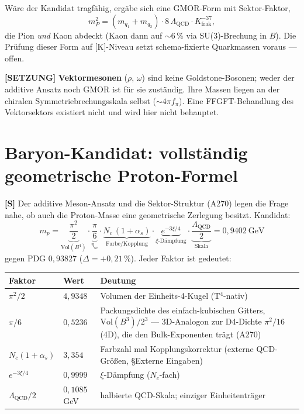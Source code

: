 Wäre der Kandidat tragfähig, ergäbe sich eine GMOR-Form mit
Sektor-Faktor,
\[
  m_P^2 = (m_{q_1}+m_{q_2})\cdot 8\,\Lambda_\text{QCD}
  \cdot K_\text{frak}^{-37},
\]
die Pion \emph{und} Kaon abdeckt (Kaon dann auf $\sim$6\,\% via
SU(3)-Brechung in $B$). Die Prüfung dieser Form auf [K]-Niveau setzt
schema-fixierte Quarkmassen voraus --- offen.

\medskip
\textbf{[SETZUNG]} \textbf{Vektormesonen} ($\rho$, $\omega$) sind keine
Goldstone-Bosonen; weder der additive Ansatz noch GMOR ist für sie
zuständig. Ihre Massen liegen an der chiralen Symmetriebrechungsskala
selbst ($\sim 4\pi f_\pi$). Eine FFGFT-Behandlung des Vektorsektors
existiert nicht und wird hier nicht behauptet.

\section{Baryon-Kandidat: vollständig geometrische Proton-Formel}

\textbf{[S]} Der additive Meson-Ansatz und die Sektor-Struktur (A270)
legen die Frage nahe, ob auch die Proton-Masse eine geometrische
Zerlegung besitzt. Kandidat:
\[
  m_p = \underbrace{\frac{\pi^2}{2}}_{\text{Vol}(B^4)}
  \cdot \underbrace{\frac{\pi}{6}}_{\eta_\text{sc}}
  \cdot \underbrace{N_c\,(1+\alpha_s)}_{\text{Farbe/Kopplung}}
  \cdot \underbrace{e^{-3\xi/4}}_{\xi\text{-Dämpfung}}
  \cdot \underbrace{\frac{\Lambda_\text{QCD}}{2}}_{\text{Skala}}
  = 0{,}9402\ \text{GeV}
\]
gegen PDG $0{,}93827$ ($\Delta = +0{,}21\,\%$). Jeder Faktor ist
gedeutet:

\begin{center}
\renewcommand{\arraystretch}{1.3}
{\small\begin{tabular}{llp{6.2cm}}
\toprule
Faktor & Wert & Deutung \\
\midrule
$\pi^2/2$ & $4{,}9348$ & Volumen der Einheits-4-Kugel (T$^4$-nativ) \\
$\pi/6$ & $0{,}5236$ & Packungsdichte des einfach-kubischen Gitters,
$\text{Vol}(B^3)/2^3$ --- 3D-Analogon zur D4-Dichte $\pi^2/16$ (4D),
die den Bulk-Exponenten trägt (A270) \\
$N_c(1+\alpha_s)$ & $3{,}354$ & Farbzahl mal Kopplungskorrektur
(externe QCD-Größen, \S{}Externe Eingaben) \\
$e^{-3\xi/4}$ & $0{,}9999$ & $\xi$-Dämpfung ($N_c$-fach) \\
$\Lambda_\text{QCD}/2$ & $0{,}1085$\,GeV & halbierte QCD-Skala;
einziger Einheitenträger \\
\bottomrule
\end{tabular}}
\renewcommand{\arraystretch}{1.0}
\end{center}

